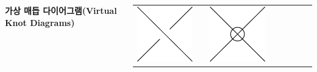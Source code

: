 \documentclass[25pt, a0paper, portrait, margin=0mm, innermargin=15mm,
     blockverticalspace=15mm, colspace=15mm, subcolspace=8mm]{tikzposter}
\def\mysection#1{\textbf{\Large\color{NTNUBlue}\sf #1}\par}
\begin{document}
\begin{columns}
{
\mysection{가상 매듭 다이어그램(Virtual Knot Diagrams)}
\bigskip
\begin{center}
\begin{tabu} to .8\linewidth{X[1.3,m,c] X[.5,c] X[1.3,m,c] X[.5,c] X[2,m,c] X[.5,c] X[2,m,c] X[.5,c]}
\includegraphics[width=\linewidth]{crossing}
& & \includegraphics[width=\linewidth]{v_crossing}

\end{tabu}
\end{center}}
\end{columns}
\end{document}
